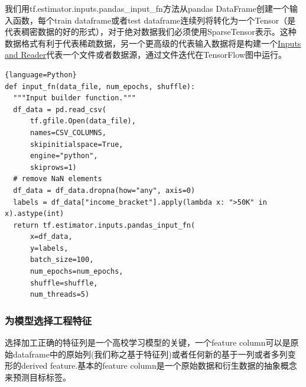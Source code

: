 我们用tf.estimator.inputs.pandas\_input\_fn方法从pandas DataFrame创建一个输入函数，每个train dataframe或者test dataframe连续列将转化为一个Tensor（是代表稠密数据的好的形式），对于绝对数据我们必须使用SparseTensor表示。这种数据格式有利于代表稀疏数据，另一个更高级的代表输入数据将是构建一个\href{https://www.tensorflow.org/api_guides/python/io_ops#inputs_and_readers}{Inputs and Reader}代表一个文件或者数据源，通过文件迭代在TensorFlow图中运行。
\begin{lstlisting}{language=Python}
def input_fn(data_file, num_epochs, shuffle):
  """Input builder function."""
  df_data = pd.read_csv(
      tf.gfile.Open(data_file),
      names=CSV_COLUMNS,
      skipinitialspace=True,
      engine="python",
      skiprows=1)
  # remove NaN elements
  df_data = df_data.dropna(how="any", axis=0)
  labels = df_data["income_bracket"].apply(lambda x: ">50K" in x).astype(int)
  return tf.estimator.inputs.pandas_input_fn(
      x=df_data,
      y=labels,
      batch_size=100,
      num_epochs=num_epochs,
      shuffle=shuffle,
      num_threads=5)
\end{lstlisting}
\subsubsection{为模型选择工程特征}
选择加工正确的特征列是一个高校学习模型的关键，一个feature column可以是原始dataframe中的原始列(我们称之基于特征列)或者任何新的基于一列或者多列变形的derived feature.基本的feature column是一个原始数据和衍生数据的抽象概念来预测目标标签。
